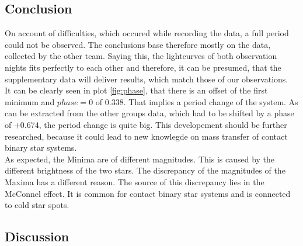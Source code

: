 \subsection{Conclusion}
  \label{sec:fuckoff}
  On account of difficulties, which occured while recording the data, a full period could not
  be observed. The conclusions base therefore mostly on the data, collected by the other team.
  Saying this, the lightcurves of both observation nights fits perfectly to each other and therefore, 
  it can be presumed, that the supplementary data will deliver results, which match those of our 
  observations.\\
  \noindent It can be clearly seen in plot \ref{fig:phase}, that there is an offset of the first minimum 
  and $phase = 0$ of $ 0.338$. That implies a period change of the system. As can be extracted from
  the other groups data, which had to be shifted by a phase of 
  $+0.674$, the period change is quite big. This developement should be 
  further researched, because it could lead to new knowlegde on mass transfer of contact binary
  star systems.\\
  \noindent As expected, the Minima are of different magnitudes. This is caused by the different brightness
  of the two stars. The discrepancy of the magnitudes of the Maxima has a different reason. The source 
  of this discrepancy lies in the McConnel effect. It is common for contact binary star systems 
  and is connected to cold star spots.

\subsection{Discussion}
  \label{sec:orange}
